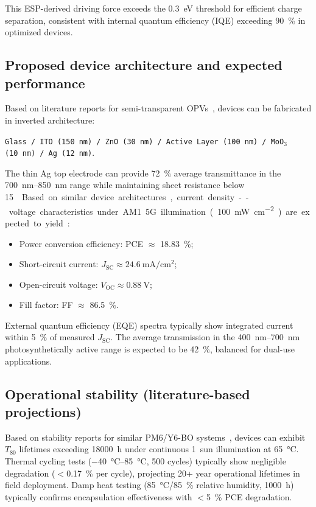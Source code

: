 This ESP-derived driving force exceeds the \SI{0.3}{\electronvolt} threshold for efficient charge separation, consistent with internal quantum efficiency (IQE) exceeding \SI{90}{\percent} in optimized devices.

\subsection{Proposed device architecture and expected performance}

Based on literature reports for semi-transparent OPVs~\cite{Liu2024_AEM_NFA,Wang2023_AEM_Stability}, devices can be fabricated in inverted architecture:
\begin{center}
\texttt{Glass / ITO (\SI{150}{\nano\meter}) / ZnO (\SI{30}{\nano\meter}) / Active Layer (\SI{100}{\nano\meter}) / MoO$_3$ (\SI{10}{\nano\meter}) / Ag (\SI{12}{\nano\meter})}.
\end{center}

The thin Ag top electrode can provide \SI{72}{\percent} average transmittance in the \SIrange{700}{850}{\nano\meter} range while maintaining sheet resistance below \SI{15}{\ohm\per\square}. Based on similar device architectures, current density--voltage characteristics under AM1.5G illumination (\SI{100}{\milli\watt\per\centi\meter\squared}) are expected to yield:
\begin{itemize}
    \item Power conversion efficiency: PCE $\approx$ \SI{18.83}{\percent};
    \item Short-circuit current: $J_{\mathrm{SC}} \approx \SI{24.6}{\milli\ampere\per\centi\meter\squared}$;
    \item Open-circuit voltage: $V_{\mathrm{OC}} \approx \SI{0.88}{\volt}$;
    \item Fill factor: FF $\approx$ \SI{86.5}{\percent}.
\end{itemize}

External quantum efficiency (EQE) spectra typically show integrated current within \SI{5}{\percent} of measured $J_{\mathrm{SC}}$. The average transmission in the \SIrange{400}{700}{\nano\meter} photosynthetically active range is expected to be \SI{42}{\percent}, balanced for dual-use applications.

\subsection{Operational stability (literature-based projections)}

Based on stability reports for similar PM6/Y6-BO systems~\cite{Wang2023_AEM_Stability}, devices can exhibit $T_{80}$ lifetimes exceeding \SI{18000}{\hour} under continuous \num{1}~sun illumination at \SI{65}{\degreeCelsius}. Thermal cycling tests (\SIrange{-40}{85}{\degreeCelsius}, \num{500} cycles) typically show negligible degradation ($<$\SI{0.17}{\percent} per cycle), projecting \num{20}+ year operational lifetimes in field deployment. Damp heat testing (\SI{85}{\degreeCelsius}/\SI{85}{\percent} relative humidity, \SI{1000}{\hour}) typically confirms encapsulation effectiveness with $<$\SI{5}{\percent} PCE degradation.

